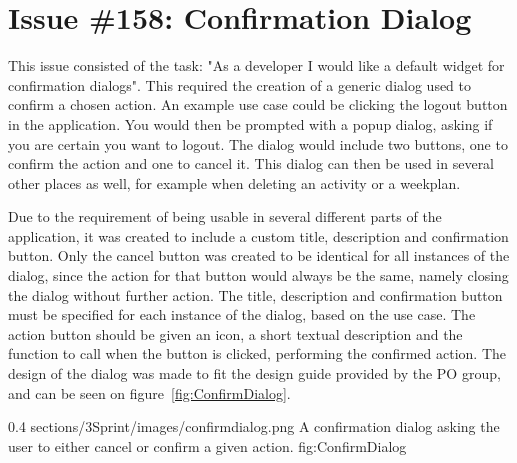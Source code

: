 \section{Issue \#158: Confirmation Dialog}
This issue consisted of the task: "As a developer I would like a default widget for confirmation dialogs". This required the creation of a generic dialog used to confirm a chosen action. An example use case could be clicking the logout button in the application. You would then be prompted with a popup dialog, asking if you are certain you want to logout. The dialog would include two buttons, one to confirm the action and one to cancel it. This dialog can then be used in several other places as well, for example when deleting an activity or a weekplan. 

Due to the requirement of being usable in several different parts of the application, it was created to include a custom title, description and confirmation button. Only the cancel button was created to be identical for all instances of the dialog, since the action for that button would always be the same, namely closing the dialog without further action.
The title, description and confirmation button must be specified for each instance of the dialog, based on the use case. The action button should be given an icon, a short textual description and the function to call when the button is clicked, performing the confirmed action.
The design of the dialog was made to fit the design guide provided by the PO group, and can be seen on figure~\ref{fig:ConfirmDialog}.


        {0.4} %
        {sections/3Sprint/images/confirmdialog.png} %
        {A confirmation dialog asking the user to either cancel or confirm a given action.} %
        {fig:ConfirmDialog} %

